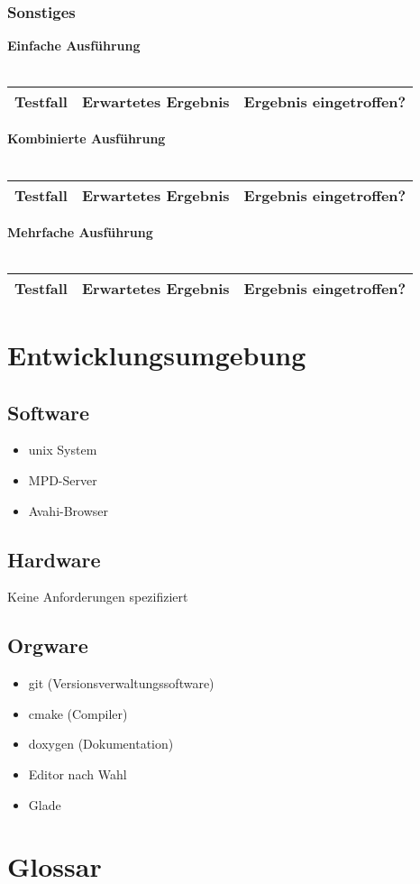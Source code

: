 \subsubsection{Sonstiges}
\textbf{Einfache Ausführung}\ \\ \\
\begin{tabular}[c]{|p{6cm}|p{6cm}|c|}
\hline
\textbf{Testfall} & \textbf{Erwartetes Ergebnis} & \textbf{Ergebnis eingetroffen?}\\
\hline
\end{tabular}
\textbf{Kombinierte Ausführung}\ \\ \\
\begin{tabular}[c]{|p{6cm}|p{6cm}|c|}
\hline
\textbf{Testfall} & \textbf{Erwartetes Ergebnis} & \textbf{Ergebnis eingetroffen?}\\
\hline
\end{tabular}
\textbf{Mehrfache Ausführung}\ \\ \\
\begin{tabular}[c]{|p{6cm}|p{6cm}|c|}
\hline
\textbf{Testfall} & \textbf{Erwartetes Ergebnis} & \textbf{Ergebnis eingetroffen?}\\
\hline
\end{tabular}
\section{Entwicklungsumgebung}
\subsection{Software}
\begin{itemize}
	\item unix System
	\item MPD-Server	
	\item Avahi-Browser
\end{itemize}
\subsection{Hardware}
Keine Anforderungen spezifiziert
\subsection{Orgware}
\begin{itemize}
	\item git (Versionsverwaltungssoftware)
	\item cmake (Compiler)
	\item doxygen (Dokumentation)
	\item Editor nach Wahl
	\item Glade
\end{itemize}
\section{Glossar}
